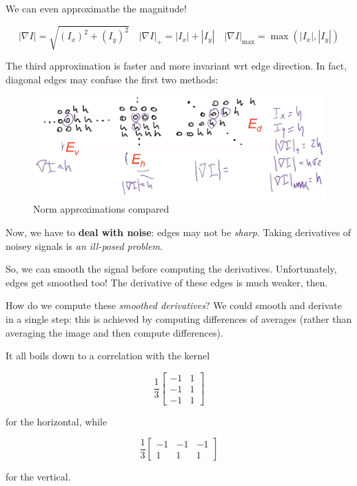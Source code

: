 \documentclass{article}
\begin{document}
We can even approximathe the magnitude!

\[|\nabla I|=\sqrt{\left(I_{x}\right)^{2}+\left(I_{y}\right)^{2}} \quad|\nabla I|_{+}=\left|I_{x}\right|+\left|I_{y}\right| \quad|\nabla I|_{\max }=\max \left(\left|I_{x}\right|,\left|I_{y}\right|\right)\]

The third approximation is faster and more invariant wrt edge direction.
In fact, diagonal edges may confuse the first two methods:

\begin{figure}
\centering
\includegraphics{./res/norm-approx-compared.png}
\caption{Norm approximations compared}
\end{figure}

Now, we have to \textbf{deal with noise}: edges may not be \emph{sharp}.
Taking derivatives of noisey signals is \emph{an ill-posed problem}.

So, we can smooth the signal before computing the derivatives.
Unfortunately, edges get smoothed too! The derivative of these edges is
much weaker, then.

How do we compute these \emph{smoothed derivatives}? We could smooth and
derivate in a single step: this is achieved by computing differences of
averages (rather than averaging the image and then compute differences).

It all boils down to a correlation with the kernel

\[
\frac{1}{3}\left[\begin{array}{ll}
-1 & 1 \\
-1 & 1 \\
-1 & 1
\end{array}\right]\]

for the horizontal, while

\[\frac{1}{3}\left[\begin{array}{ccc}
-1 & -1 & -1 \\
1 & 1 & 1
\end{array}\right]
\]

for the vertical.
\end{document}
